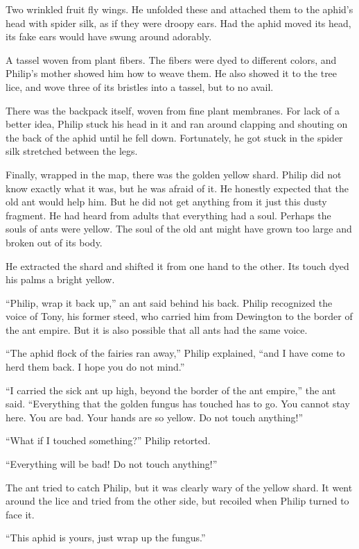 \documentclass[10pt, draft]{memoir}
\begin{document}
Two wrinkled fruit fly wings. He unfolded these and attached them to the aphid's head with spider silk, as if they were droopy ears. Had the aphid moved its head, its fake ears would have swung around adorably.

A tassel woven from plant fibers. The fibers were dyed to different colors, and Philip's mother showed him how to weave them. He also showed it to the tree lice, and wove three of its bristles into a tassel, but to no avail.

There was the backpack itself, woven from fine plant membranes. For lack of a better idea, Philip stuck his head in it and ran around clapping and shouting on the back of the aphid until he fell down. Fortunately, he got stuck in the spider silk stretched between the legs.

Finally, wrapped in the map, there was the golden yellow shard. Philip did not know exactly what it was, but he was afraid of it. He honestly expected that the old ant would help him. But he did not get anything from it just this dusty fragment. He had heard from adults that everything had a soul. Perhaps the souls of ants were yellow. The soul of the old ant might have grown too large and broken out of its body.

He extracted the shard and shifted it from one hand to the other. Its touch dyed his palms a bright yellow.

``Philip, wrap it back up,'' an ant said behind his back. Philip recognized the voice of Tony, his former steed, who carried him from Dewington to the border of the ant empire. But it is also possible that all ants had the same voice.

``The aphid flock of the fairies ran away,'' Philip explained, ``and I have come to herd them back. I hope you do not mind.''

``I carried the sick ant up high, beyond the border of the ant empire,'' the ant said. ``Everything that the golden fungus has touched has to go. You cannot stay here. You are bad. Your hands are so yellow. Do not touch anything!''

``What if I touched something?'' Philip retorted.

``Everything will be bad! Do not touch anything!''

The ant tried to catch Philip, but it was clearly wary of the yellow shard. It went around the lice and tried from the other side, but recoiled when Philip turned to face it.

``This aphid is yours, just wrap up the fungus.''
\end{document}
